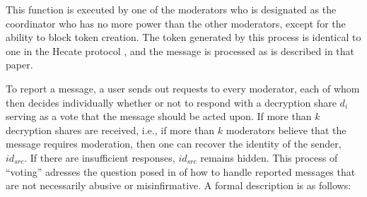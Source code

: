 \documentclass[conference]{IEEEtran}
\begin{document}
\smallskip

\begin{algorithmic}[1]
\end{algorithmic}

\smallskip

This function is executed by one of the moderators who is designated as the coordinator who has no more power than the other moderators, except for the ability to block token creation. The token generated by this process is identical to one in the Hecate protocol \cite{hecate}, and the message is processed as is described in that paper.

To report a message, a user sends out requests to every moderator, each of whom then decides individually whether or not to respond with a decryption share $d_i$ serving as a vote that the message should be acted upon.
If more than $k$ decryption shares are received, i.e., if more than $k$ moderators believe that the message requires moderation, then one can recover the identity of the sender, $id_{src}$. If there are insufficient responses, $id_{src}$ remains hidden.
This process of ``voting'' adresses the question posed in \cite{hecate} of how to handle reported messages that are not necessarily abusive or misinfirmative. A formal description is as follows:

\smallskip

\begin{algorithmic}[1]
\end{algorithmic}
\end{document}
